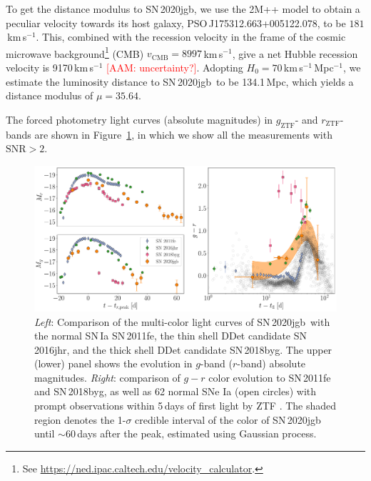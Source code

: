 \documentclass[twocolumn]{aastex631}
\newcommand{\sn}{SN\,2020jgb}
\newcommand{\adam}[1]{\textcolor{red}{[AAM: #1]}}
\begin{document}
To get the distance modulus to \sn, we use the 2M++ model \citep{Carrick2015_2M++} to obtain a peculiar velocity towards its host galaxy, PSO\,J175312.663+005122.078, to be $181$\,km\,s$^{-1}$. This, combined with the recession velocity in the frame of the cosmic microwave background\footnote{See \url{https://ned.ipac.caltech.edu/velocity_calculator}.} (CMB) $v_\mathrm{CMB}=8997$\,km\,s$^{-1}$, give a net Hubble recession velocity is 9170\,km\,s$^{-1}$ \adam{uncertainty?}. Adopting $H_0=70$\,km\,s$^{-1}$\,Mpc$^{-1}$, we estimate the luminosity distance to \sn\ to be 134.1\,Mpc, which yields a distance modulus of $\mu=35.64$.

The forced photometry light curves (absolute magnitudes) in $g_\mathrm{ZTF}$- and $r_\mathrm{ZTF}$-bands are shown in Figure~\ref{fig:photometry}, in which we show all the measurements with $\mathrm{SNR}>2$.

\begin{figure}
    \centering
    \includegraphics[width=\textwidth]{photometry.pdf}
    \caption{\textit{Left}: Comparison of the multi-color light curves  of \sn\ with the normal SN\,Ia SN\,2011fe, the thin shell DDet candidate SN\,2016jhr, and the thick shell DDet candidate SN\,2018byg. The upper (lower) panel shows the evolution in $g$-band ($r$-band) absolute magnitudes. \textit{Right}: comparison of $g-r$ color evolution to SN\,2011fe and SN\,2018byg, as well as 62 normal SNe Ia (open circles) with prompt observations within 5\,days of first light by ZTF \citep{Bulla2020}. The shaded region denotes the 1-$\sigma$ credible interval of the color of SN\,2020jgb until $\sim$60\,days after the peak, estimated using Gaussian process.}
    \label{fig:photometry}
\end{figure}
\end{document}
